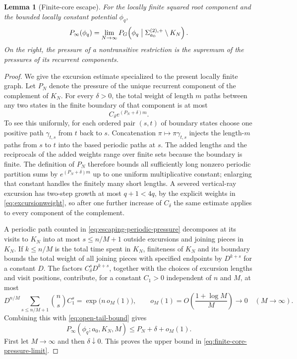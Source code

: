 \documentclass[11pt,reqno]{amsart}
\numberwithin{equation}{section}
\newtheorem{lemma}[theorem]{Lemma}
\theoremstyle{definition}
\theoremstyle{remark}
\begin{document}
\begin{lemma}[Finite-core escape]
\label{lem:finite-core-escape}
For the locally finite squared root component and the bounded locally constant
potential $\phi_q$,
\begin{equation}\label{eq:finite-core-pressure-limit}
 P_\infty(\phi_q)
 =\lim_{N\to\infty}
 P_G\!\left(\phi_q\bigm|
 \Sigma^{(2),+}_{a_0}\setminus K_N\right).
\end{equation}
On the right, the pressure of a nontransitive restriction is the supremum of
the pressures of its recurrent components.
\end{lemma}

\begin{proof}
We give the excursion estimate specialized to the present locally finite
graph.  Let $P_N$ denote the pressure of the unique recurrent component of
the complement of $K_N$.  For every $\delta>0$, the total weight of length
$m$ paths between any two states in the finite boundary of that component is
at most
\begin{equation}\label{eq:open-tail-bound}
 C_\delta e^{(P_N+\delta)m}.
\end{equation}
To see this uniformly, for each ordered pair $(s,t)$ of boundary states choose
one positive path $\gamma_{t,s}$ from $t$ back to $s$.  Concatenation
$\pi\mapsto\pi\gamma_{t,s}$ injects the length-$m$ paths from $s$ to $t$ into
the based periodic paths at $s$.  The added lengths and the reciprocals of the
added weights range over finite sets because the boundary is finite.  The
definition of $P_N$ therefore bounds all sufficiently long nonzero periodic
partition sums by $e^{(P_N+\delta)m}$ up to one uniform multiplicative
constant; enlarging that constant handles the finitely many short lengths.
A severed vertical-ray excursion has two-step growth at most $q+1<4q$, by the
explicit weights in \eqref{eq:excursionweight}, so after one further increase
of $C_\delta$ the same estimate applies to every component of the complement.

A periodic path counted in \eqref{eq:escaping-periodic-pressure} decomposes at
its visits to $K_N$ into at most $s\le n/M+1$ outside excursions and joining
pieces in $K_N$.  If $k\le n/M$ is the total time spent in $K_N$, finiteness
of $K_N$ and its boundary bounds the total weight of all joining pieces with
specified endpoints by $D^{k+s}$ for a constant $D$.  The factors
$C_\delta^sD^{k+s}$, together with the choices of excursion lengths and visit
positions, contribute, for a constant $C_1>0$ independent of $n$ and $M$, at most
\[
 D^{n/M}\sum_{s\le n/M+1}\binom ns C_1^s
 =\exp\!\bigl(n\,o_M(1)\bigr),
 \qquad o_M(1)=O\!\left(\frac{1+\log M}{M}\right)
 \longrightarrow0\quad(M\to\infty).
\]
Combining this with \eqref{eq:open-tail-bound} gives
\[
 P_\infty(\phi_q;a_0,K_N,M)
 \le P_N+\delta+o_M(1).
\]
First let $M\to\infty$ and then $\delta\downarrow0$.  This proves the upper
bound in \eqref{eq:finite-core-pressure-limit}.


\end{proof}
\end{document}
